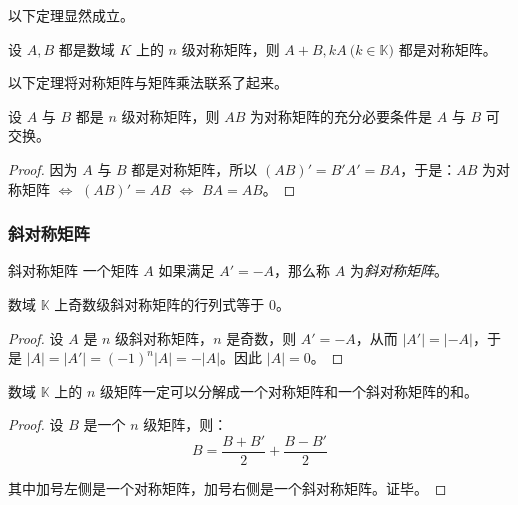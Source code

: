 以下定理显然成立。

\begin{theorem}
	设 $A, B$ 都是数域 $K$ 上的 $n$ 级对称矩阵，则 $A + B, kA \pod{k \in \mathbb K}$ 都是对称矩阵。
\end{theorem}

以下定理将对称矩阵与矩阵乘法联系了起来。

\begin{theorem}
	设 $A$ 与 $B$ 都是 $n$ 级对称矩阵，则 $AB$ 为对称矩阵的充分必要条件是 $A$ 与 $B$ 可交换。
\end{theorem}

\begin{proof}
	因为 $A$ 与 $B$ 都是对称矩阵，所以 $(AB)' = B'A' = BA$，于是：$AB$ 为对称矩阵 $\Longleftrightarrow$ $(AB)' = AB$ $\Longleftrightarrow$ $BA =  AB$。
\end{proof}

\subsubsection{斜对称矩阵}

\begin{definition}{斜对称矩阵}
	一个矩阵 $A$ 如果满足 $A' = -A$，那么称 $A$ 为\emph{斜对称矩阵}。
\end{definition}

\begin{theorem}
	数域 $\mathbb K$ 上奇数级斜对称矩阵的行列式等于 $0$。
\end{theorem}

\begin{proof}
	设 $A$ 是 $n$ 级斜对称矩阵，$n$ 是奇数，则 $A' = -A$，从而 $|A'| = |-A|$，于是 $|A| = |A'| = (-1)^n |A| = -|A|$。因此 $|A| = 0$。
\end{proof}

\begin{theorem}
	数域 $\mathbb K$ 上的 $n$ 级矩阵一定可以分解成一个对称矩阵和一个斜对称矩阵的和。
\end{theorem}

\begin{proof}
	设 $B$ 是一个 $n$ 级矩阵，则：
	$$
	B = \dfrac{B + B'}{2} + \dfrac{B - B'}{2}
	$$

	其中加号左侧是一个对称矩阵，加号右侧是一个斜对称矩阵。证毕。
\end{proof}